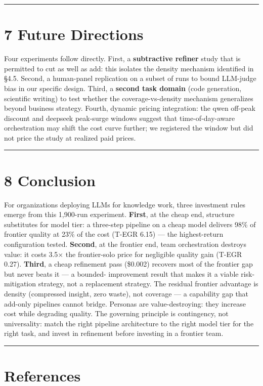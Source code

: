 \documentclass[11pt,a4paper]{article}
\begin{document}
\hrule


\section{7 Future Directions}

Four experiments follow directly. First, a \textbf{subtractive refiner}
study that is permitted to cut as well as add: this isolates the
density mechanism identified in §4.5. Second, a \textit{}human-panel
replication\textit{} on a subset of runs to bound LLM-judge bias in our
specific design. Third, a \textbf{second task domain} (code generation,
scientific writing) to test whether the coverage-vs-density
mechanism generalizes beyond business strategy. Fourth, \textit{}dynamic
pricing integration\textit{}: the qwen off-peak discount and deepseek
peak-surge windows suggest that time-of-day-aware orchestration may
shift the cost curve further; we registered the window but did not
price the study at realized paid prices.

\hrule


\section{8 Conclusion}

For organizations deploying LLMs for knowledge work, three investment
rules emerge from this 1,900-run experiment. \textbf{First}, at the cheap end,
structure substitutes for model tier: a three-step pipeline on a cheap model
delivers 98\% of frontier quality at 23\% of the cost (T-EGR 6.15) — the
highest-return configuration tested. \textbf{Second}, at the frontier end, team
orchestration destroys value: it costs 3.5× the frontier-solo price for
negligible quality gain (T-EGR 0.27). \textbf{Third}, a cheap refinement pass
(\$0.002) recovers most of the frontier gap but never beats it — a bounded-
improvement result that makes it a viable risk-mitigation strategy, not a
replacement strategy. The residual frontier advantage is density (compressed
insight, zero waste), not coverage — a capability gap that add-only pipelines
cannot bridge. Personas are value-destroying: they increase cost while
degrading quality. The governing principle is contingency, not universality:
match the right pipeline architecture to the right model tier for the right
task, and invest in refinement before investing in a frontier team.

\hrule


\section{References}
\end{document}
